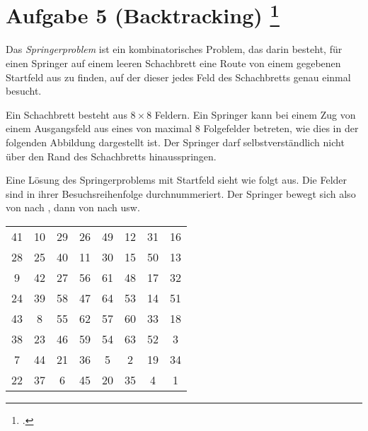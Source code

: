 \documentclass{bschlangaul-aufgabe}
\begin{document}
\let\j=\bJavaCode


\section{Aufgabe 5 (Backtracking)
\footcite[Thema 2 Aufgabe 5 Seite 11-12]{examen:46115:2018:09}}

Das \emph{Springerproblem} ist ein kombinatorisches Problem, das darin
besteht, für einen Springer auf einem leeren Schachbrett eine Route von
einem gegebenen Startfeld aus zu finden, auf der dieser jedes Feld des
Schachbretts genau einmal besucht.

Ein Schachbrett besteht aus $8 \times 8$ Feldern. Ein Springer kann bei
einem Zug von einem Ausgangsfeld aus eines von maximal $8$ Folgefelder
betreten, wie dies in der folgenden Abbildung dargestellt ist. Der
Springer darf selbstverständlich nicht über den Rand des Schachbretts
hinausspringen.

\begin{center}
\end{center}

Eine Lösung des Springerproblems mit Startfeld \j{h1} sieht wie folgt
aus. Die Felder sind in ihrer Besuchsreihenfolge durchnummeriert. Der
Springer bewegt sich also von \j{h1} nach \j{f2}, dann von \j{f2} nach
\j{h3} usw.

\begin{center}
\begin{tabular}{cccccccc}
41&10&29&26&49&12&31&16\\
28&25&40&11&30&15&50&13\\
9&42&27&56&61&48&17&32\\
24&39&58&47&64&53&14&51\\
43&8&55&62&57&60&33&18\\
38&23&46&59&54&63&52&3\\
7&44&21&36&5&2&19&34\\
22&37&6&45&20&35&4&1\\
\end{tabular}
\end{center}
\end{document}
